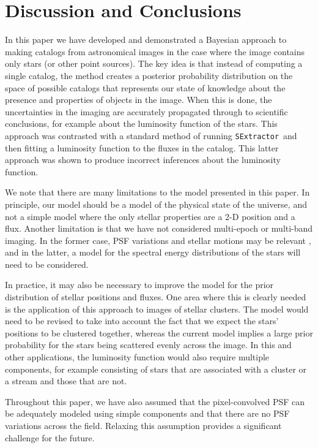 \documentclass[12pt, preprint]{aastex}
\newcommand{\sex}{{\tt SExtractor}}
\begin{document}
\section{Discussion and Conclusions}\label{sec:conclusion}

In this paper we have developed and demonstrated a Bayesian approach to
making catalogs from astronomical images in the case where the image contains
only stars (or other point sources). The key idea is that instead of computing
a single catalog, the method creates a posterior probability distribution on
the space of possible catalogs that represents our state of knowledge about
the presence and properties of objects in the image. When this is done, the
uncertainties in the imaging are accurately propagated through to scientific
conclusions, for example about the luminosity function of the stars.
This approach was contrasted with a standard method of running \sex~and then
fitting a luminosity function to the fluxes in the catalog. This latter approach
was shown to produce incorrect inferences about the luminosity function.

We note that there are many limitations to the model presented in this paper.
In principle, our model should be a model of the physical state of the universe,
and not a simple model where the only stellar properties are a 2-D position and
a flux. Another limitation is that we have not considered multi-epoch or multi-band
imaging. In the former case, PSF variations and stellar motions may be relevant
\citep{lang}, and in the latter, a model for the spectral energy distributions
of the stars will need to be considered.

In practice, it may also be necessary to improve the model for the prior
distribution
of stellar positions and fluxes. One area where this is clearly needed is the
application of this approach to images of stellar clusters. The model would need
to be revised to take into account the fact that we expect the stars' positions
to be clustered together, whereas the current model implies a large prior
probability for the stars being scattered evenly across the image. In this and
other applications, the luminosity function would also require multiple
components, for example consisting of stars that are associated with a cluster
or a stream and those that are not.

Throughout this paper, we have also assumed that the pixel-convolved PSF can
be adequately modeled using simple components and that there are no PSF
variations across the field. Relaxing this assumption provides a significant
challenge for the future.
\end{document}
